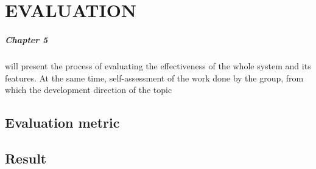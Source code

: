 \chapter{EVALUATION}
\label{conclusion}
\paragraph{Chapter 5}will present the process of evaluating the effectiveness of the whole system and its features. At the same time, self-assessment of the work done by the group, from which the development direction of the topic

\section{Evaluation metric}
\section{Result}


